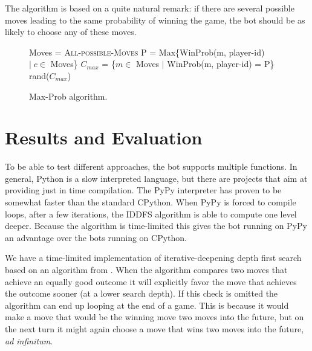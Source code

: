 \documentclass[a4paper,11pt]{article}
\begin{document}
The algorithm is based on a quite natural remark: if there are several
possible moves leading to the same probability of winning the game, the bot
should be as likely to choose any of these moves.

\begin{figure}
\begin{algorithmic}
\State Moves = \textsc{All-possible-Moves}
\State P = Max\{WinProb(m, player-id) $| \; c \in$ Moves\}
\State $C_{max}$ = \{$m \in$ Moves $|$ WinProb(m, player-id) = P\}
\State \Return rand($C_{max}$)
\EndFunction
\end{algorithmic}
\caption{Max-Prob algorithm.}
\end{figure}

\section{Results and Evaluation}

To be able to test different approaches, the bot supports multiple
functions. In general, Python is a slow interpreted language, but
there are projects that aim at providing just in time compilation. The
PyPy interpreter has proven to be somewhat faster than the standard
CPython. When PyPy is forced to compile loops, after a few iterations,
the IDDFS algorithm is able to compute one level deeper. Because the
algorithm is time-limited this gives the bot running on PyPy an
advantage over the bots running on CPython.

We have a time-limited implementation of iterative-deepening depth
first search based on an algorithm from \cite{aimodern}. When the
algorithm compares two moves that achieve an equally good outcome it
will explicitly favor the move that achieves the outcome sooner (at a
lower search depth). If this check is omitted the algorithm can end up
looping at the end of a game. This is because it would make a move
that would be the winning move two moves into the future, but on the
next turn it might again choose a move that wins two moves into the
future, \emph{ad infinitum}.
\end{document}
